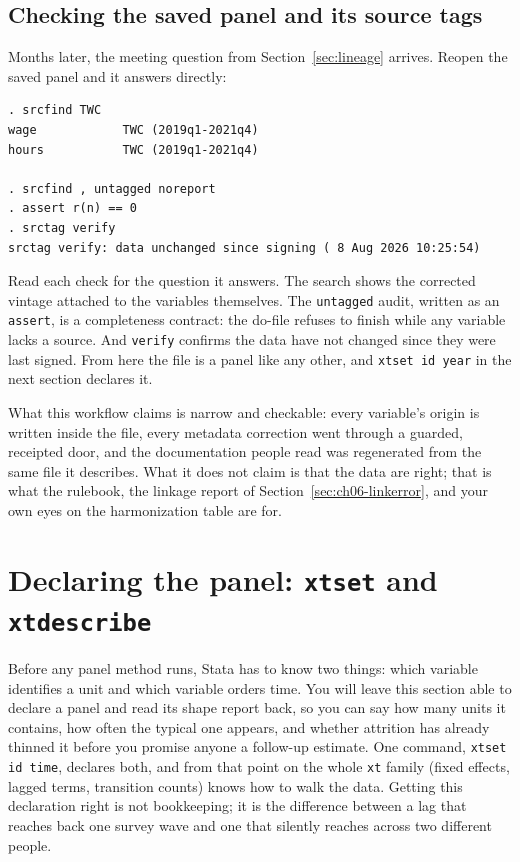 \subsection{Checking the saved panel and its source tags}
Months later, the meeting question from Section~\ref{sec:lineage} arrives. Reopen the saved panel and it answers directly:
\par
{\footnotesize
\begin{verbatim}
. srcfind TWC
wage            TWC (2019q1-2021q4)
hours           TWC (2019q1-2021q4)

. srcfind , untagged noreport
. assert r(n) == 0
. srctag verify
srctag verify: data unchanged since signing ( 8 Aug 2026 10:25:54)
\end{verbatim}
}
Read each check for the question it answers. The search shows the corrected vintage attached to the variables themselves. The \texttt{untagged} audit, written as an \texttt{assert}, is a completeness contract: the do-file refuses to finish while any variable lacks a source. And \texttt{verify} confirms the data have not changed since they were last signed. From here the file is a panel like any other, and \texttt{xtset id year} in the next section declares it.

What this workflow claims is narrow and checkable: every variable's origin is written inside the file, every metadata correction went through a guarded, receipted door, and the documentation people read was regenerated from the same file it describes. What it does not claim is that the data are right; that is what the rulebook, the linkage report of Section~\ref{sec:ch06-linkerror}, and your own eyes on the harmonization table are for.

\section{Declaring the panel: \texttt{xtset} and \texttt{xtdescribe}}\label{sec:xtset}
Before any panel method runs, Stata has to know two things: which variable identifies a unit and which variable orders time. You will leave this section able to declare a panel and read its shape report back, so you can say how many units it contains, how often the typical one appears, and whether attrition has already thinned it before you promise anyone a follow-up estimate. One command, \texttt{xtset id time}, declares both, and from that point on the whole \texttt{xt} family (fixed effects, lagged terms, transition counts) knows how to walk the data. Getting this declaration right is not bookkeeping; it is the difference between a lag that reaches back one survey wave and one that silently reaches across two different people.


